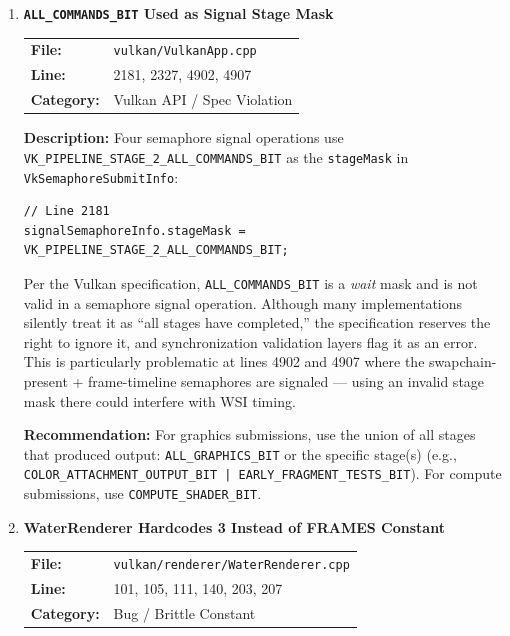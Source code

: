 \documentclass[a4paper,12pt]{article}
\newcommand{\severitybox}[2]{%
  \colorbox{#1}{\makebox[2.5cm][c]{\textcolor{white}{\textbf{#2}}}}%
}
\begin{document}
\begin{enumerate}[leftmargin=*]

\item[\textbf{[B7]}] \textbf{\texttt{ALL\_COMMANDS\_BIT} Used as Signal Stage Mask}
  \hfill \severitybox{highcolor}{HIGH}

  \begin{tabular}{ll}
    \textbf{File:} & \texttt{vulkan/VulkanApp.cpp} \\
    \textbf{Line:} & 2181, 2327, 4902, 4907 \\
    \textbf{Category:} & Vulkan API / Spec Violation \\
  \end{tabular}

  \textbf{Description:}
  Four semaphore signal operations use
  \texttt{VK\_PIPELINE\_STAGE\_2\_ALL\_COMMANDS\_BIT} as the \texttt{stageMask}
  in \texttt{VkSemaphoreSubmitInfo}:

\begin{lstlisting}
// Line 2181
signalSemaphoreInfo.stageMask = VK_PIPELINE_STAGE_2_ALL_COMMANDS_BIT;
\end{lstlisting}

  Per the Vulkan specification, \texttt{ALL\_COMMANDS\_BIT} is a \textit{wait}
  mask and is not valid in a semaphore signal operation. Although many
  implementations silently treat it as ``all stages have completed,'' the
  specification reserves the right to ignore it, and synchronization validation
  layers flag it as an error. This is particularly problematic at lines 4902
  and 4907 where the swapchain-present + frame-timeline semaphores are
  signaled — using an invalid stage mask there could interfere with WSI
  timing.

  \textbf{Recommendation:}
  For graphics submissions, use the union of all stages that produced output:
  \texttt{ALL\_GRAPHICS\_BIT} or the specific stage(s) (e.g.,
  \texttt{COLOR\_ATTACHMENT\_OUTPUT\_BIT | EARLY\_FRAGMENT\_TESTS\_BIT}).
  For compute submissions, use \texttt{COMPUTE\_SHADER\_BIT}.

\item[\textbf{[B8]}] \textbf{WaterRenderer Hardcodes 3 Instead of FRAMES Constant}
  \hfill \severitybox{highcolor}{HIGH}

  \begin{tabular}{ll}
    \textbf{File:} & \texttt{vulkan/renderer/WaterRenderer.cpp} \\
    \textbf{Line:} & 101, 105, 111, 140, 203, 207 \\
    \textbf{Category:} & Bug / Brittle Constant \\
  \end{tabular}


\end{enumerate}
\end{document}

